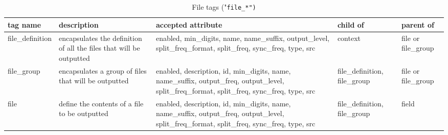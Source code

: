 \documentclass[../tex_main/NEMO_manual]{subfiles}
\begin{document}
\begin{table} \scriptsize
	\begin{tabularx}{\textwidth}{|l|X|X|X|l|} \hline
	tag name                                                            & 
	description                                                         & 
	accepted attribute                                                  & 
	child of                                                            & 
	parent of           \\ \hline \hline
	file\_definition                                                    & 
	encapsulates the definition of all the files that will be outputted & 
	enabled, min\_digits, name, name\_suffix, output\_level,
	split\_freq\_format, split\_freq, sync\_freq, type, src             & 
	context                                                             & 
	file or file\_group \\ \hline
	file\_group                                                         & 
	encapsulates a group of files that will be outputted                & 
	enabled, description, id, min\_digits, name, name\_suffix, output\_freq, output\_level,
	split\_freq\_format, split\_freq, sync\_freq, type, src             & 
	file\_definition, file\_group                                       & 
	file or file\_group \\ \hline
	file                                                                & 
	define the contents of a file to be outputted                       & 
	enabled, description, id, min\_digits, name, name\_suffix, output\_freq, output\_level,
	split\_freq\_format, split\_freq, sync\_freq, type, src             & 
	file\_definition, file\_group                                       & 
	field               \\ \hline
	\end{tabularx}
	\caption{File tags ("\tt{file\_*}")}
\end{table}
\end{document}
